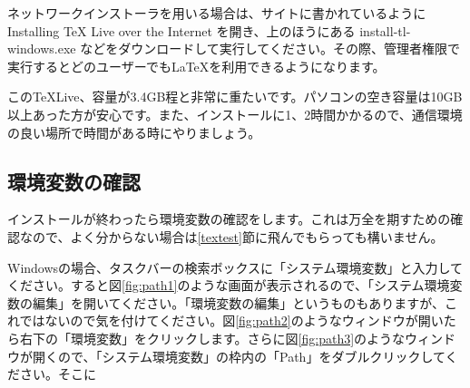 ネットワークインストーラを用いる場合は、サイトに書かれているように Installing TeX Live over the Internet を開き、上のほうにある install-tl-windows.exe などをダウンロードして実行してください。その際、管理者権限で実行するとどのユーザーでも\LaTeX を利用できるようになります。

この\TeX Live、容量が3.4GB程と非常に重たいです。パソコンの空き容量は10GB以上あった方が安心です。また、インストールに1、2時間かかるので、通信環境の良い場所で時間がある時にやりましょう。

\subsection{環境変数の確認}
インストールが終わったら環境変数の確認をします。これは万全を期すための確認なので、よく分からない場合は\ref{textest}節に飛んでもらっても構いません。

Windowsの場合、タスクバーの検索ボックスに「システム環境変数」と入力してください。すると図\ref{fig:path1}のような画面が表示されるので、「システム環境変数の編集」を開いてください。「環境変数の編集」というものもありますが、これではないので気を付けてください。図\ref{fig:path2}のようなウィンドウが開いたら右下の「環境変数」をクリックします。さらに図\ref{fig:path3}のようなウィンドウが開くので、「システム環境変数」の枠内の「Path」をダブルクリックしてください。そこに

